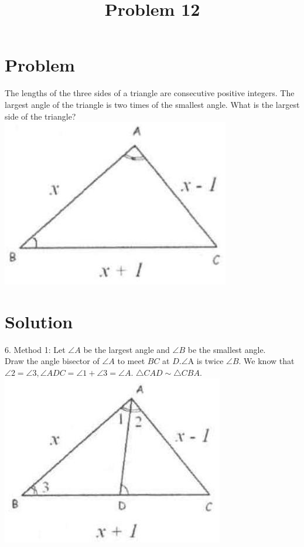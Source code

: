 \documentclass{article}
\title{Problem 12}
\date{}
\begin{document}
\maketitle

\section*{Problem}
The lengths of the three sides of a triangle are consecutive positive integers. The largest angle of the triangle is two times of the smallest angle. What is the largest side of the triangle?\\
\centering
\includegraphics[width=\textwidth]{images/066(3).jpg}

\section*{Solution}
6.
Method 1: Let \(\angle A\) be the largest angle and \(\angle B\) be the smallest angle.\\
Draw the angle bisector of \(\angle A\) to meet \(B C\) at \(D . \angle \mathrm{A}\) is twice \(\angle B\). We know that \(\angle 2=\angle 3, \angle A D C=\angle 1+\angle 3=\angle A\). \(\triangle C A D \sim \triangle C B A\).\\
\centering
\includegraphics[width=\textwidth]{images/072(1).jpg}
\end{document}
